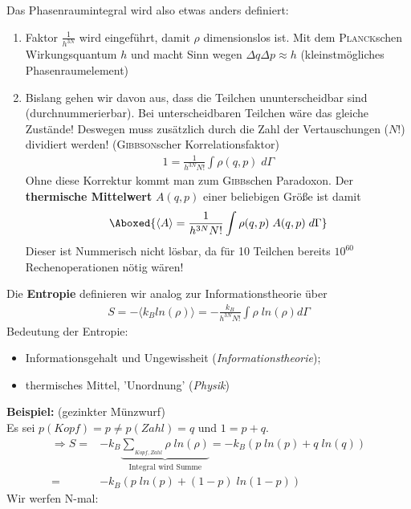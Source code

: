 \documentclass[12pt]{article}
\begin{document}
Das Phasenraumintegral wird also etwas anders definiert:
\begin{enumerate}
\item Faktor $\frac{1}{h^{3N}}$ wird eingeführt, damit $\rho $ dimensionslos ist. Mit dem \textsc{Planck}schen Wirkungsquantum $h$ und macht Sinn wegen $\Delta q \Delta p \approx h$ (kleinstmögliches Phasenraumelement)
\item Bislang gehen wir davon aus, dass die Teilchen ununterscheidbar sind (durchnummerierbar). Bei unterscheidbaren Teilchen wäre das gleiche Zustände! Deswegen muss zusätzlich durch die Zahl der Vertauschungen ($N! $) dividiert werden! (\textsc{Gibbson}scher Korrelationsfaktor)
\begin{align}
1 = \frac{1}{h^{3N} N!} \int \rho (q,p)\;  d\Gamma
\end{align}
Ohne diese Korrektur kommt man zum \textsc{Gibb}schen Paradoxon. Der \textbf{thermische Mittelwert} $A(q,p)$ einer beliebigen Größe ist damit
\begin{align}
\Aboxed{ \langle A \rangle = \frac{1}{h^{3N} N!} \int \rho (q,p)\; A(q,p) \;  d\Gamma }
\end{align}
Dieser ist Nummerisch nicht lösbar, da für 10 Teilchen bereits $10^{60}$ Rechenoperationen nötig wären! 
\end{enumerate}
Die \textbf{Entropie} definieren wir analog zur Informationstheorie über 
\begin{align}
S = - \langle k_B ln(\rho ) \rangle  = -\frac{k_B}{h^{3N} N!} \int \rho \; ln(\rho ) d\Gamma 
\end{align}
Bedeutung der Entropie: 
\begin{itemize}
\item Informationsgehalt und Ungewissheit (\textit{Informationstheorie});
\item  thermisches Mittel, 'Unordnung' (\textit{Physik})
\end{itemize}  

\textbf{Beispiel:} (gezinkter Münzwurf)\\
Es sei $p(Kopf) = p \neq p(Zahl)= q$ und $1=p+q$. %
\begin{align*}
\Rightarrow S =& - k_B \underbrace{\sum_{_{Kopf, Zahl}} \rho \; ln(\rho ) }_\text{Integral wird Summe} = -k_B  (p \; ln(p) + q \; ln(q)) \\
=&  -k_B ( p \; ln(p) + (1-p) \; ln(1-p))
\end{align*}
Wir werfen N-mal:
\end{document}
